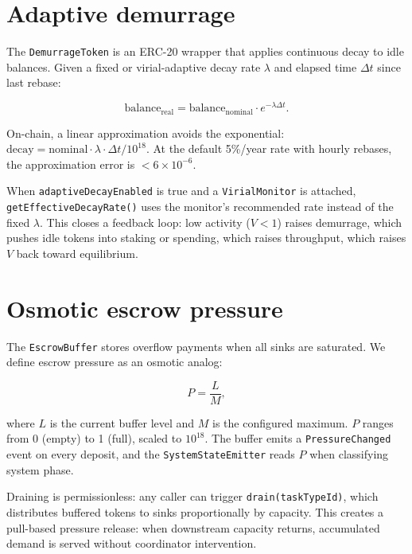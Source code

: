 \documentclass[11pt]{article}
\theoremstyle{definition}
\theoremstyle{remark}
\begin{document}
\section{Adaptive demurrage}
\label{sec:demur}

The \texttt{DemurrageToken} is an ERC-20 wrapper that applies
continuous decay to idle balances. Given a fixed or virial-adaptive
decay rate $\lambda$ and elapsed time $\Delta t$ since last rebase:

\begin{equation}
  \text{balance}_{\text{real}} = \text{balance}_{\text{nominal}} \cdot
    e^{-\lambda \Delta t}.
  \label{eq:decay}
\end{equation}

On-chain, a linear approximation avoids the exponential:
$\text{decay} = \text{nominal} \cdot \lambda \cdot \Delta t / 10^{18}$.
At the default 5\%/year rate with hourly rebases, the approximation
error is $< 6 \times 10^{-6}$.

When \texttt{adaptiveDecayEnabled} is true and a
\texttt{VirialMonitor} is attached, \texttt{getEffectiveDecayRate()}
uses the monitor's recommended rate instead of the fixed $\lambda$.
This closes a feedback loop: low activity ($V < 1$) raises demurrage,
which pushes idle tokens into staking or spending, which raises
throughput, which raises $V$ back toward equilibrium.

\section{Osmotic escrow pressure}
\label{sec:osmo}

The \texttt{EscrowBuffer} stores overflow payments when all sinks are
saturated. We define escrow pressure as an osmotic analog:

\begin{equation}
  P = \frac{L}{M},
  \label{eq:pressure}
\end{equation}

\noindent where $L$ is the current buffer level and $M$ is the
configured maximum. $P$ ranges from 0 (empty) to 1 (full), scaled to
$10^{18}$. The buffer emits a \texttt{PressureChanged} event on every
deposit, and the \texttt{SystemStateEmitter} reads $P$ when
classifying system phase.

Draining is permissionless: any caller can trigger
\texttt{drain(taskTypeId)}, which distributes buffered tokens to sinks
proportionally by capacity. This creates a pull-based pressure
release: when downstream capacity returns, accumulated demand is
served without coordinator intervention.
\end{document}

